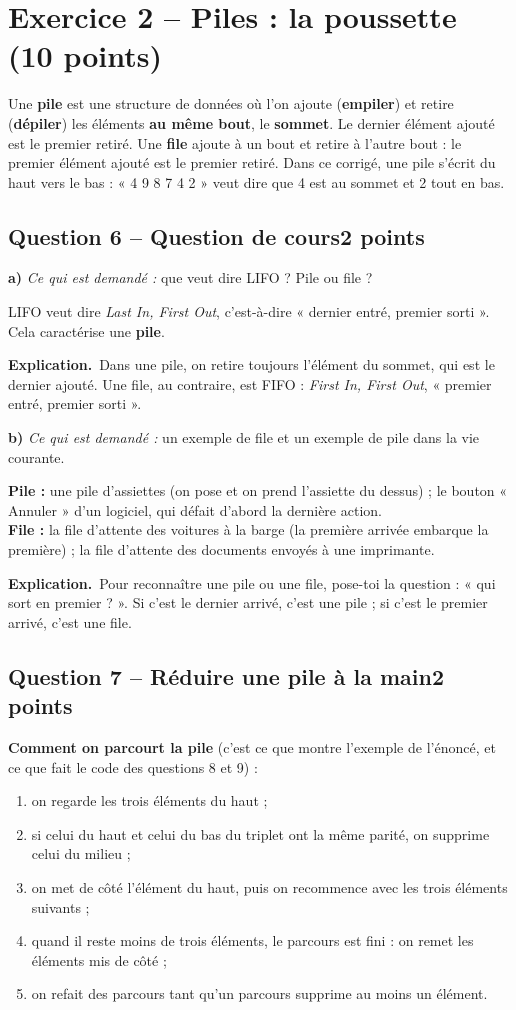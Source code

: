 \documentclass[11pt, a4paper]{exam}
\newcommand{\Qt}[2]{\subsection*{#1\hfill{\normalfont\small #2}}}
\newcommand{\rappel}[1]{\noindent\textit{Ce qui est demandé :} #1\par\smallskip}
\newcommand{\explication}{\noindent\textbf{Explication.}\ }
\begin{document}
\section*{Exercice 2 -- Piles : la poussette (10 points)}

\begin{retenir}
Une \textbf{pile} est une structure de données où l'on ajoute (\textbf{empiler}) et retire (\textbf{dépiler}) les éléments \textbf{au même bout}, le \textbf{sommet}. Le dernier élément ajouté est le premier retiré.
Une \textbf{file} ajoute à un bout et retire à l'autre bout : le premier élément ajouté est le premier retiré.
Dans ce corrigé, une pile s'écrit du haut vers le bas : « 4 9 8 7 4 2 » veut dire que 4 est au sommet et 2 tout en bas.
\end{retenir}

\Qt{Question 6 -- Question de cours}{2 points}

\textbf{a)} \rappel{que veut dire LIFO ? Pile ou file ?}
\begin{reponse}
LIFO veut dire \textit{Last In, First Out}, c'est-à-dire « dernier entré, premier sorti ». Cela caractérise une \textbf{pile}.
\end{reponse}
\explication Dans une pile, on retire toujours l'élément du sommet, qui est le dernier ajouté. Une file, au contraire, est FIFO : \textit{First In, First Out}, « premier entré, premier sorti ».

\textbf{b)} \rappel{un exemple de file et un exemple de pile dans la vie courante.}
\begin{reponse}
\textbf{Pile :} une pile d'assiettes (on pose et on prend l'assiette du dessus) ; le bouton « Annuler » d'un logiciel, qui défait d'abord la dernière action.\\
\textbf{File :} la file d'attente des voitures à la barge (la première arrivée embarque la première) ; la file d'attente des documents envoyés à une imprimante.
\end{reponse}
\explication Pour reconnaître une pile ou une file, pose-toi la question : « qui sort en premier ? ». Si c'est le dernier arrivé, c'est une pile ; si c'est le premier arrivé, c'est une file.

\Qt{Question 7 -- Réduire une pile à la main}{2 points}

\begin{retenir}
\textbf{Comment on parcourt la pile} (c'est ce que montre l'exemple de l'énoncé, et ce que fait le code des questions 8 et 9) :
\begin{enumerate}
\item on regarde les trois éléments du haut ;
\item si celui du haut et celui du bas du triplet ont la même parité, on supprime celui du milieu ;
\item on met de côté l'élément du haut, puis on recommence avec les trois éléments suivants ;
\item quand il reste moins de trois éléments, le parcours est fini : on remet les éléments mis de côté ;
\item on refait des parcours tant qu'un parcours supprime au moins un élément.
\end{enumerate}
\end{retenir}
\end{document}
